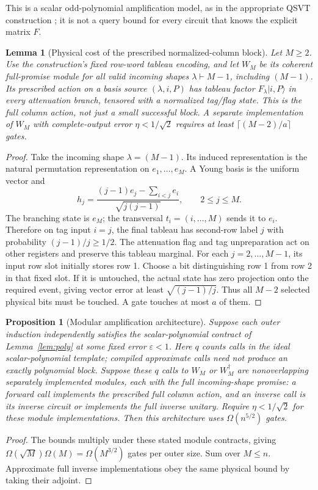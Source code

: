 \documentclass[11pt]{article}
\newtheorem{lemma}[theorem]{Lemma}
\newtheorem{proposition}[theorem]{Proposition}
\theoremstyle{definition}
\newcommand{\ket}[1]{\lvert #1\rangle}
\begin{document}
This is a scalar odd-polynomial amplification model, as in the appropriate
QSVT construction \cite{QSVT}; it is not a query bound for every circuit
that knows the explicit matrix $F$.

\begin{lemma}[Physical cost of the prescribed normalized-column block]
Let $M\ge2$. Use the construction's fixed row-word tableau encoding, and
let $W_M$ be its coherent full-promise module for all valid incoming shapes
$\lambda\vdash M-1$, including $(M-1)$. Its prescribed action on a basis
source $(\lambda,i,P)$ has tableau factor $F_\lambda\ket{i,P}$ in every
attenuation branch, tensored with a normalized tag/flag state. This is
the full column action, not just a small successful block. A separate
implementation of $W_M$ with complete-output error $\eta<1/\sqrt2$
requires at least $\lceil(M-2)/a\rceil$ gates.
\end{lemma}
\begin{proof}
Take the incoming shape $\lambda=(M-1)$. Its induced representation is
the natural permutation representation on $e_1,\ldots,e_M$. A Young basis
is the uniform vector and
\[
 h_j=\frac{(j-1)e_j-\sum_{i<j}e_i}{\sqrt{j(j-1)}},\qquad 2\le j\le M.
\]
The branching state is $e_M$; the transversal $t_i=(i,\ldots,M)$ sends
it to $e_i$. Therefore on tag input $i=j$, the final tableau has second-row
label $j$ with probability $(j-1)/j\ge1/2$. The attenuation flag and tag
unpreparation act on other registers and preserve this tableau marginal.
For each $j=2,\ldots,M-1$, its input row slot initially stores row 1.
Choose a bit distinguishing row 1 from row 2 in that fixed slot. If it is
untouched, the actual state has zero projection onto the required event,
giving vector error at least $\sqrt{(j-1)/j}$. Thus all $M-2$ selected
physical bits must be touched. A gate touches at most $a$ of them.
\end{proof}

\begin{proposition}[Modular amplification architecture]
Suppose each outer induction independently satisfies the scalar-polynomial
contract of Lemma~\ref{lem:poly} at some fixed error $\varepsilon<1$.
Here $q$ counts calls in the ideal scalar-polynomial template; compiled
approximate calls need not produce an exactly polynomial block.
Suppose these $q$ calls to $W_M$ or $W_M^\dagger$ are nonoverlapping separately
implemented modules, each with the full incoming-shape promise: a forward
call implements the prescribed full column action, and an inverse call is
its inverse circuit or implements the full inverse unitary. Require
$\eta<1/\sqrt2$ for these module implementations.
Then this architecture uses $\Omega(n^{5/2})$ gates.
\end{proposition}
\begin{proof}
The bounds multiply under these stated module contracts, giving
$\Omega(\sqrt M)\Omega(M)=\Omega(M^{3/2})$ gates per outer size.
Sum over $M\le n$. Approximate full inverse implementations obey the same
physical bound by taking their adjoint.
\end{proof}
\end{document}
